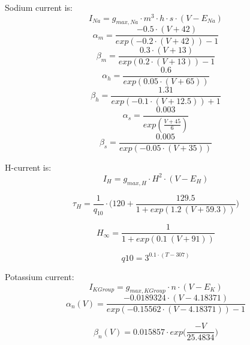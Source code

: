 \documentclass[a4paper,12pt]{article}
\begin{document}
Sodium current is:
\begin{equation}
\label{eq:Navcck}
I_{Na} = g_{max, Na} \cdot m^3 \cdot h \cdot s \cdot (V - E_{Na})
\end{equation}
\begin{equation}
\alpha_m = \frac{-0.5 \cdot (V + 42)}{exp(-0.2\cdot(V+42)) - 1}
\end{equation}
\begin{equation}
\beta_m = \frac{0.3 \cdot (V + 13)}{exp(0.2\cdot(V+13)) - 1}
\end{equation}
\begin{equation}
\alpha_h = \frac{0.6}{exp(0.05\cdot(V+65))}
\end{equation}
\begin{equation}
\beta_h = \frac{1.31}{exp(-0.1\cdot(V+12.5)) + 1}
\end{equation}
\begin{equation}
\alpha_s = \frac{0.003}{exp( \frac{V+45}{6})}
\end{equation}
\begin{equation}
\beta_s = \frac{0.005}{exp(-0.05\cdot(V+35))}
\end{equation}

H-current is:
\begin{equation}
\label{eq:HCN}
I_{H} = g_{max, H} \cdot H^2 \cdot (V - E_{H})
\end{equation}

\begin{equation}
\tau_{H} = \frac{1}{q_{10}} \cdot \Bigg(120 + \frac{129.5}{1 + exp(1.2 \ (V + 59.3))} \Bigg)
\end{equation}

\begin{equation}
H_{\infty} =  \frac{1}{1 + exp(0.1 \ (V + 91))}
\end{equation}

\begin{equation}
q10 = 3^{0.1\cdot (T - 307) } 
\end{equation}

Potassium current:
\begin{equation}
\label{eq:KvGroup}
I_{KGroup} = g_{max, KGroup} \cdot n \cdot (V - E_K)
\end{equation}
\begin{equation}
\alpha_n(V) = \frac{-0.0189324 \cdot (V - 4.18371) }{exp(-0.15562\cdot (V - 4.18371)) - 1}
\end{equation}

\begin{equation}
\beta_n(V) = 0.015857 \cdot exp \Big(\frac{-V}{25.4834}\Big)
\end{equation}
\end{document}
